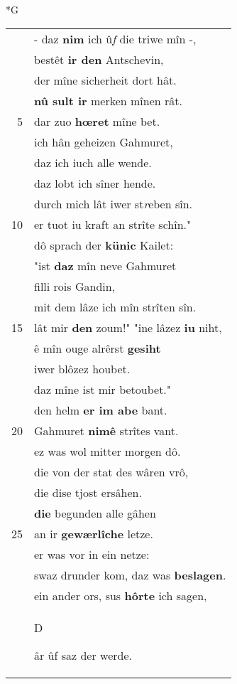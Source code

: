 \documentclass[8pt,a4paper,notitlepage]{article}
\begin{document}
\newpage
\begin{table}[ht]
\begin{minipage}[t]{0.5\linewidth}
\small
\begin{center}*G
\end{center}
\begin{tabular}{rl}
 & - daz \textbf{nim} ich û\textit{f} die triwe mîn -,\\ 
 & bestêt \textbf{ir den} Antschevin,\\ 
 & der mîne sicherheit dort hât.\\ 
 & \textbf{nû sult ir} merken mînen rât.\\ 
5 & dar zuo \textbf{hœret} mîne bet.\\ 
 & ich hân geheizen Gahmuret,\\ 
 & daz ich iuch alle wende.\\ 
 & daz lobt ich sîner hende.\\ 
 & durch mich lât iwer st\textit{r}eben sîn.\\ 
10 & er tuot iu kraft an strîte schîn."\\ 
 & dô sprach der \textbf{künic} Kailet:\\ 
 & "ist \textbf{daz} mîn neve Gahmuret\\ 
 & filli rois Gandin,\\ 
 & mit dem lâze ich mîn strîten sîn.\\ 
15 & lât mir \textbf{den} zoum!" "ine lâzez \textbf{iu} niht,\\ 
 & ê mîn ouge alrêrst \textbf{gesiht}\\ 
 & iwer blôzez houbet.\\ 
 & daz mîne ist mir betoubet."\\ 
 & den helm \textbf{er im abe} bant.\\ 
20 & Gahmuret \textbf{nimê} strîtes vant.\\ 
 & ez was wol mitter morgen dô.\\ 
 & die von der stat des wâren vrô,\\ 
 & die dise tjost ersâhen.\\ 
 & \textbf{die} begunden alle gâhen\\ 
25 & an ir \textbf{gewærlîche} letze.\\ 
 & er was vor in ein netze:\\ 
 & swaz drunder kom, daz was \textbf{beslagen}.\\ 
 & ein ander ors, sus \textbf{hôrte} ich sagen,\\ 
 & \begin{large}D\end{large}âr ûf saz der werde.\\ 

\end{tabular}
\end{minipage}
\end{table}
\end{document}
